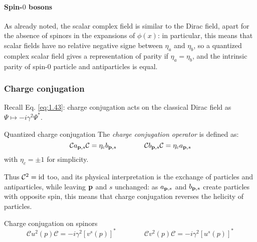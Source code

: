 \paragraph{Spin-$ 0 $ bosons}

As already noted, the scalar complex field is similar to the Dirac field, apart for the absence of spinors in the expansions of $ \phi(x) $: in particular, this means that scalar fields have no relative negative signe between $ \eta_a $ and $ \eta_b $, so a quantized complex scalar field gives a representation of parity if $ \eta_a = \eta_b $, and the intrinsic parity of spin-$ 0 $ particle and antiparticles is equal.

\subsubsection{Charge conjugation}

Recall Eq. \ref{eq:1.43}: charge conjugation acts on the classical Dirac field as $ \Psi \mapsto -i \gamma^2 \Psi^* $.

\begin{definition}{Quantized charge conjugation}{}
  The \textit{charge conjugation operator} is defined as:
  \begin{equation}
    \mathcal{C} a_{\mathbf{p},s} \mathcal{C} = \eta_c b_{\mathbf{p},s}
    \qquad \qquad
    \mathcal{C} b_{\mathbf{p},s} \mathcal{C} = \eta_c a_{\mathbf{p},s}
    \label{eq:2.33}
  \end{equation}
  with $ \eta_c = \pm 1 $ for simplicity.
\end{definition}

Thus $ \mathcal{C}^2 = \operatorname{id} $ too, and its physical interpretation is the exchange of particles and antiparticles, while leaving $ \mathbf{p} $ and $ s $ unchanged: as $ a_{\mathbf{p},s} $ and $ b_{\mathbf{p},s} $ create particles with opposite spin, this means that charge conjugation reverses the helicity of particles.

\begin{lemma}{Charge conjugation on spinors}{}
  \begin{equation}
    \mathcal{C} u^2(p) \mathcal{C} = -i \gamma^2 \left[ v^s(p) \right]^*
    \qquad \qquad
    \mathcal{C} v^2(p) \mathcal{C} = -i \gamma^2 \left[ u^s(p) \right]^*
    \label{eq:2.34}
  \end{equation}
\end{lemma}

